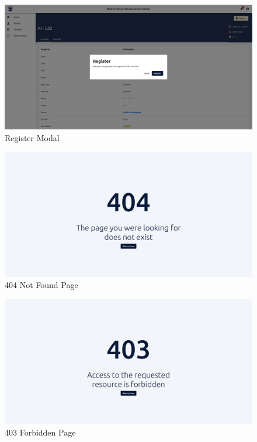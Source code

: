 \begin{justify}
    \begin{figure}[H]
        \centerline{\includegraphics[width=150mm,scale=1]{figures/implementation_and_testing/implementation/frontend/pages/Viewer - Register Modal.png}}
        \caption{Register Modal}
    \end{figure}

    \begin{figure}[H]
        \centerline{\includegraphics[width=150mm,scale=1]{figures/implementation_and_testing/implementation/frontend/pages/404.png}}
        \caption{404 Not Found Page}
    \end{figure}

    \begin{figure}[H]
        \centerline{\includegraphics[width=150mm,scale=1]{figures/implementation_and_testing/implementation/frontend/pages/403.png}}
        \caption{403 Forbidden Page}
    \end{figure}



\end{justify}
